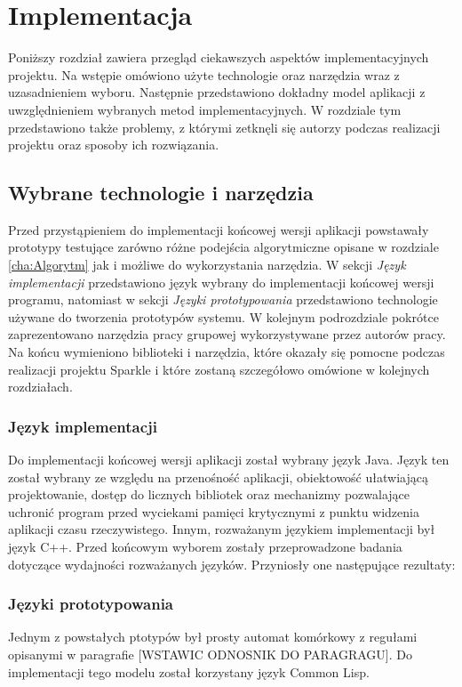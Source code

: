 ﻿\chapter {Implementacja}
\label{cha:implementacja}
Poniższy rozdział zawiera przegląd ciekawszych aspektów implementacyjnych projektu.
Na wstępie omówiono użyte technologie oraz narzędzia wraz z uzasadnieniem wyboru. Następnie przedstawiono dokładny model aplikacji z uwzględnieniem wybranych metod implementacyjnych. 
W rozdziale tym przedstawiono także problemy, z którymi zetknęli się autorzy podczas realizacji projektu oraz sposoby ich rozwiązania.
\section {Wybrane technologie i narzędzia}
Przed przystąpieniem do implementacji końcowej wersji aplikacji powstawały prototypy testujące zarówno różne podejścia algorytmiczne opisane w rozdziale \ref{cha:Algorytm} jak i możliwe do wykorzystania narzędzia. W sekcji \textit{Język implementacji} przedstawiono język wybrany do implementacji końcowej wersji programu, natomiast w sekcji \textit{Języki prototypowania} przedstawiono technologie używane do tworzenia prototypów systemu. 
W kolejnym podrozdziale pokrótce zaprezentowano narzędzia pracy grupowej wykorzystywane przez autorów pracy. Na końcu wymieniono biblioteki i narzędzia, które okazały się pomocne podczas realizacji projektu Sparkle i które zostaną szczegółowo omówione w kolejnych rozdziałach.
\subsection{Język implementacji}
Do implementacji końcowej wersji aplikacji został wybrany język Java.
Język ten został wybrany ze względu na przenośność aplikacji, obiektowość ułatwiającą projektowanie, dostęp do licznych 
bibliotek oraz mechanizmy pozwalające uchronić program przed wyciekami pamięci krytycznymi z punktu widzenia aplikacji czasu rzeczywistego. Innym, rozważanym językiem implementacji był język C++. Przed końcowym wyborem zostały przeprowadzone badania dotyczące wydajności rozważanych języków. Przyniosły one następujące rezultaty:
\begin{itemize}

\end{itemize}

\subsection{Języki prototypowania}
Jednym z powstałych ptotypów był prosty automat komórkowy z regułami opisanymi w paragrafie [WSTAWIC ODNOSNIK DO PARAGRAGU]. Do implementacji tego modelu został korzystany język Common Lisp.

